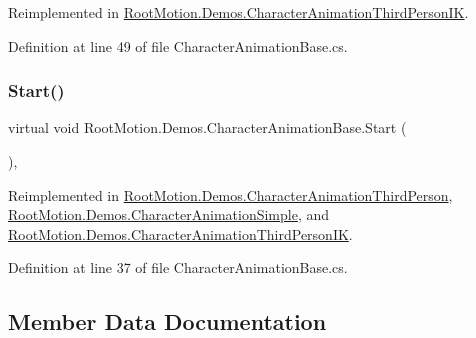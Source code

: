 Reimplemented in \mbox{\hyperlink{class_root_motion_1_1_demos_1_1_character_animation_third_person_i_k_ab7032a39a642f6ac754d6ab4cf9bb342}{Root\+Motion.\+Demos.\+Character\+Animation\+Third\+Person\+IK}}.



Definition at line 49 of file Character\+Animation\+Base.\+cs.

\mbox{\label{class_root_motion_1_1_demos_1_1_character_animation_base_a4ddfae1bf92b14f0f1bb9ddd56ed093d}} 
\subsubsection{\texorpdfstring{Start()}{Start()}}
{\footnotesize\ttfamily virtual void Root\+Motion.\+Demos.\+Character\+Animation\+Base.\+Start (\begin{DoxyParamCaption}{ }\end{DoxyParamCaption})\hspace{0.3cm}{\ttfamily [protected]}, {\ttfamily [virtual]}}



Reimplemented in \mbox{\hyperlink{class_root_motion_1_1_demos_1_1_character_animation_third_person_a1cdf638262be99e19f767b42aa2a9a9a}{Root\+Motion.\+Demos.\+Character\+Animation\+Third\+Person}}, \mbox{\hyperlink{class_root_motion_1_1_demos_1_1_character_animation_simple_a0c5809611cc12b2339420de15dc3bcc2}{Root\+Motion.\+Demos.\+Character\+Animation\+Simple}}, and \mbox{\hyperlink{class_root_motion_1_1_demos_1_1_character_animation_third_person_i_k_a5af2e754eefe0eb694062fdc4ebcc0ee}{Root\+Motion.\+Demos.\+Character\+Animation\+Third\+Person\+IK}}.



Definition at line 37 of file Character\+Animation\+Base.\+cs.



\subsection{Member Data Documentation}
\mbox{\label{class_root_motion_1_1_demos_1_1_character_animation_base_a3783ba9a51e05162a006683c5d034168}} 
